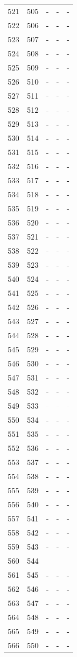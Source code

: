 \documentclass[10pt]{article}
\begin{document}
\begin {longtable}{l r r r r}
521 & 505 & - & - & - \\
522 & 506 & - & - & - \\
523 & 507 & - & - & - \\
524 & 508 & - & - & - \\
525 & 509 & - & - & - \\
526 & 510 & - & - & - \\
527 & 511 & - & - & - \\
528 & 512 & - & - & - \\
529 & 513 & - & - & - \\
530 & 514 & - & - & - \\
531 & 515 & - & - & - \\
532 & 516 & - & - & - \\
533 & 517 & - & - & - \\
534 & 518 & - & - & - \\
535 & 519 & - & - & - \\
536 & 520 & - & - & - \\
537 & 521 & - & - & - \\
538 & 522 & - & - & - \\
539 & 523 & - & - & - \\
540 & 524 & - & - & - \\
541 & 525 & - & - & - \\
542 & 526 & - & - & - \\
543 & 527 & - & - & - \\
544 & 528 & - & - & - \\
545 & 529 & - & - & - \\
546 & 530 & - & - & - \\
547 & 531 & - & - & - \\
548 & 532 & - & - & - \\
549 & 533 & - & - & - \\
550 & 534 & - & - & - \\
551 & 535 & - & - & - \\
552 & 536 & - & - & - \\
553 & 537 & - & - & - \\
554 & 538 & - & - & - \\
555 & 539 & - & - & - \\
556 & 540 & - & - & - \\
557 & 541 & - & - & - \\
558 & 542 & - & - & - \\
559 & 543 & - & - & - \\
560 & 544 & - & - & - \\
561 & 545 & - & - & - \\
562 & 546 & - & - & - \\
563 & 547 & - & - & - \\
564 & 548 & - & - & - \\
565 & 549 & - & - & - \\
566 & 550 & - & - & - \\ \hline
\end{longtable}
\end{document}
